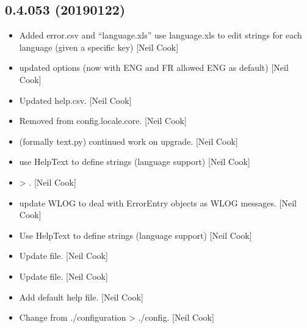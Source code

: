 \documentclass[a4paper,10pt,english]{report}
\begin{document}
\subsection{0.4.053 (2019\sphinxhyphen{}01\sphinxhyphen{}22)}
\label{\detokenize{misc/changelog:id229}}\begin{itemize}
\item {} 
Added error.csv and “language.xls” \sphinxhyphen{} use language.xls to edit strings
for each language (given a specific key) {[}Neil Cook{]}

\item {} 
 \sphinxhyphen{} updated options (now with ENG and FR allowed \sphinxhyphen{} ENG
as default) {[}Neil Cook{]}

\item {} 
Updated help.csv. {[}Neil Cook{]}

\item {} 
Removed  from config.locale.core. {[}Neil Cook{]}

\item {} 
 \sphinxhyphen{} (formally text.py) \sphinxhyphen{} continued work on upgrade. {[}Neil
Cook{]}

\item {} 
 \sphinxhyphen{} use HelpText to define strings (language
support) {[}Neil Cook{]}

\item {} 
 \sphinxhyphen{}  \textendash{}\textgreater{} . {[}Neil Cook{]}

\item {} 
 \sphinxhyphen{} update WLOG to deal with ErrorEntry objects as WLOG
messages. {[}Neil Cook{]}

\item {} 
Use HelpText to define strings (language support) {[}Neil Cook{]}

\item {} 
Update  file. {[}Neil Cook{]}

\item {} 
Update  file. {[}Neil Cook{]}

\item {} 
Add default help file. {[}Neil Cook{]}

\item {} 
Change from ./configuration \textendash{}\textgreater{} ./config. {[}Neil Cook{]}


\end{itemize}
\end{document}
